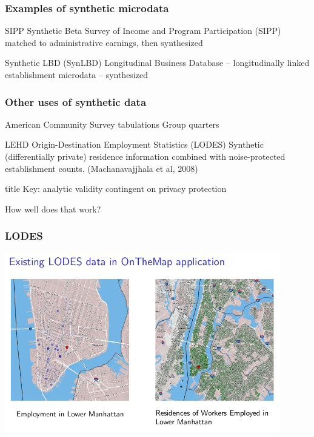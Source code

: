 \begin{frame}
	\frametitle{Examples of synthetic microdata}
	\begin{block}{SIPP Synthetic Beta}
		Survey of Income and Program Participation (SIPP) matched to administrative earnings, then synthesized
	\end{block}
	\begin{block}{Synthetic LBD (SynLBD)}
	   Longitudinal Business Database -- longitudinally linked establishment microdata -- synthesized
	\end{block}
\end{frame}

\begin{frame}
	\frametitle{Other uses of synthetic data}
	\begin{block}{American Community Survey tabulations}
		Group quarters
		\end{block}
		\begin{block}{LEHD Origin-Destination Employment Statistics (LODES)}
          Synthetic (differentially private) residence information combined with noise-protected establishment counts. (Machanavajjhala et al, 2008)
\end{block}
\end{frame}


\begin{frame}
	\begin{beamercolorbox}[sep=8pt,center]{title}
		 Key: analytic validity contingent on privacy protection
	\end{beamercolorbox}
	\centering \vspace{2cm}
How well does that work?
\end{frame}

\begin{frame}
	\frametitle{LODES}
	\centering
	\includegraphics[width=0.9\textwidth]{sam-4}
\end{frame}



